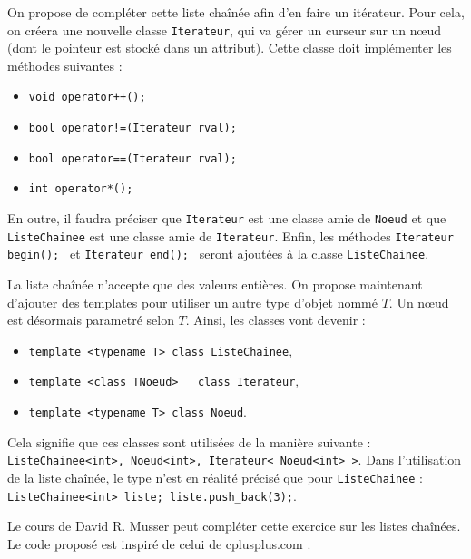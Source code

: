 \documentclass[abstracton]{scrartcl}
\begin{document}
On propose de compléter cette liste chaînée afin d'en faire un itérateur. Pour cela, on créera une nouvelle classe \lstinline{Iterateur}, qui va gérer un curseur sur un nœud (dont le pointeur est stocké dans un attribut). Cette classe doit implémenter les méthodes suivantes :
\begin{itemize}
    \item \lstinline{void operator++();}
	\item \lstinline{bool operator!=(Iterateur rval);}
	\item \lstinline{bool operator==(Iterateur rval);}
	\item \lstinline{int operator*();}
\end{itemize}
En outre, il faudra préciser que \lstinline{Iterateur} est une classe amie de \lstinline{Noeud} et que \lstinline{ListeChainee} est une classe amie de \lstinline{Iterateur}. Enfin, les méthodes \lstinline{Iterateur begin(); } et \lstinline{Iterateur end(); } seront ajoutées à la classe \lstinline{ListeChainee}.




La liste chaînée n'accepte que des valeurs entières. On propose maintenant d'ajouter des templates pour utiliser un autre type d'objet nommé $T$. Un nœud est désormais parametré selon $T$. Ainsi, les classes vont devenir :
\begin{itemize}
    \item \lstinline{template <typename T> class ListeChainee},
    \item \lstinline{template <class TNoeud>   class Iterateur},
    \item \lstinline{template <typename T> class Noeud}.
\end{itemize}
Cela signifie que ces classes sont utilisées de la manière suivante :
\lstinline{ListeChainee<int>, Noeud<int>, Iterateur< Noeud<int> >}.
Dans l'utilisation de la liste chaînée, le type n'est en réalité précisé que pour \lstinline{ListeChainee} : \lstinline{ListeChainee<int> liste; liste.push_back(3);}.



Le cours de David R. Musser \cite{coursLC}  peut compléter cette exercice sur les listes chaînées. Le code proposé est inspiré de celui de cplusplus.com \cite{cplusplus}.

\end{document}
